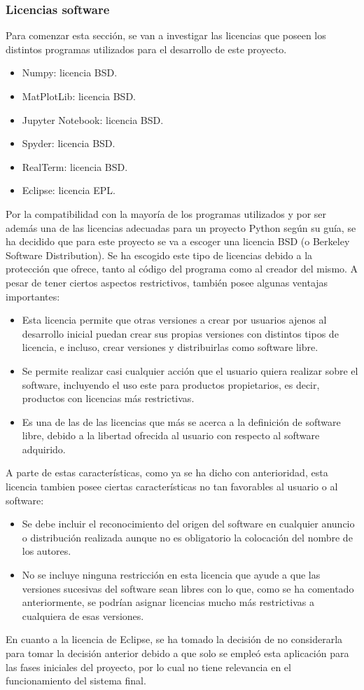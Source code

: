 \subsubsection{Licencias software}
Para comenzar esta sección, se van a investigar las licencias que poseen los distintos programas utilizados para el desarrollo de este proyecto.
\begin{itemize}
	\item Numpy: licencia BSD.
	\item MatPlotLib: licencia BSD.
	\item Jupyter Notebook: licencia BSD.
	\item Spyder: licencia BSD.
	\item RealTerm: licencia BSD.
	\item Eclipse: licencia EPL.
\end{itemize}
Por la compatibilidad con la mayoría de los programas utilizados y por ser además una de las licencias adecuadas para un proyecto Python según su guía, se ha decidido que para este proyecto se va a escoger una licencia BSD (o Berkeley Software Distribution). Se ha escogido este tipo de licencias debido a la protección que ofrece, tanto al código del programa como al creador del mismo. A pesar de tener ciertos aspectos restrictivos, también posee algunas ventajas importantes:
\begin{itemize}
	\item Esta licencia permite que otras versiones a crear por usuarios ajenos al desarrollo inicial puedan crear sus propias versiones con distintos tipos de licencia, e incluso, crear versiones y distribuirlas como software libre.
	\item Se permite realizar casi cualquier acción que el usuario quiera realizar sobre el software, incluyendo el uso este para productos propietarios, es decir, productos con licencias más restrictivas.
	\item Es una de las de las licencias que más se acerca a la definición de software libre, debido a la libertad ofrecida al usuario con respecto al software adquirido.
\end{itemize}
A parte de estas características, como ya se ha dicho con anterioridad, esta licencia tambien posee ciertas características no tan favorables al usuario o al software:
\begin{itemize}
	\item Se debe incluir el reconocimiento del origen del software en cualquier anuncio o distribución realizada aunque no es obligatorio la colocación del nombre de los autores.
	\item No se incluye ninguna restricción en esta licencia que ayude a que las versiones sucesivas del software sean libres con lo que, como se ha comentado anteriormente, se podrían asignar licencias mucho más restrictivas a cualquiera de esas versiones.
\end{itemize}
En cuanto a la licencia de Eclipse, se ha tomado la decisión de no considerarla para tomar la decisión anterior debido a que solo se empleó esta aplicación para las fases iniciales del proyecto, por lo cual no tiene relevancia en el funcionamiento del sistema final.